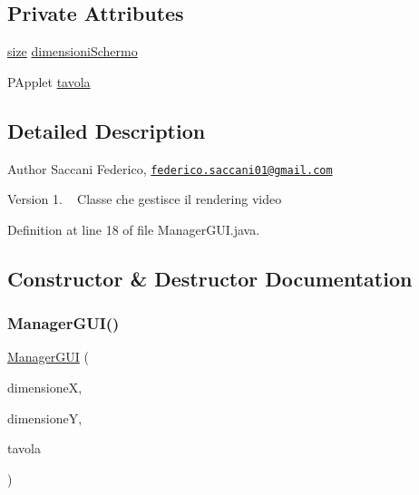 \subsection*{Private Attributes}
\begin{DoxyCompactItemize}
\item 
\mbox{\hyperlink{class_snake_1_1gui_1_1size}{size}} \mbox{\hyperlink{class_snake_1_1gui_1_1_manager_g_u_i_afb06bc6415a42c22b3a6d0d140a4885f}{dimensioni\+Schermo}}
\item 
P\+Applet \mbox{\hyperlink{class_snake_1_1gui_1_1_manager_g_u_i_a75f316b1f7fa183ba86929af39a01720}{tavola}}
\end{DoxyCompactItemize}


\subsection{Detailed Description}
\begin{DoxyAuthor}{Author}
Saccani Federico, \href{mailto:federico.saccani01@gmail.com}{\tt federico.\+saccani01@gmail.\+com} 
\end{DoxyAuthor}
\begin{DoxyVersion}{Version}
1. ~\newline
Classe che gestisce il rendering video 
\end{DoxyVersion}


Definition at line 18 of file Manager\+G\+U\+I.\+java.



\subsection{Constructor \& Destructor Documentation}
\mbox{\label{class_snake_1_1gui_1_1_manager_g_u_i_a2006dad197b32f07d7b3e790cac126ff}} 
\subsubsection{\texorpdfstring{Manager\+G\+U\+I()}{ManagerGUI()}}
{\footnotesize\ttfamily \mbox{\hyperlink{class_snake_1_1gui_1_1_manager_g_u_i}{Manager\+G\+UI}} (\begin{DoxyParamCaption}\item[{int}]{dimensioneX,  }\item[{int}]{dimensioneY,  }\item[{P\+Applet}]{tavola }\end{DoxyParamCaption})}



